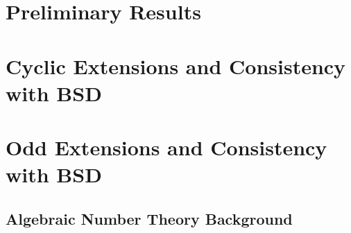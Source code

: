 \documentclass{article}
\theoremstyle{plain}
\theoremstyle{definition}
\begin{document}
\newpage
\section{Preliminary Results}\label{sec_preliminary}


\newpage
\section{Cyclic Extensions and Consistency with BSD}\label{sec_cyclic}


\newpage
\section{Odd Extensions and Consistency with BSD}\label{sec_odd}


%

\newpage
\begin{appendices}
\section{Algebraic Number Theory Background}
%

\end{appendices}

\newpage
\thispagestyle{empty}


\end{document}
